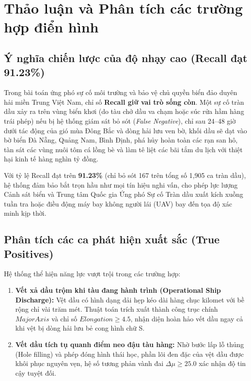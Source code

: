 \section{Thảo luận và Phân tích các trường hợp điển hình}
\label{sec:discussion}

\subsection{Ý nghĩa chiến lược của độ nhạy cao (Recall đạt 91.23\%)}
Trong bài toán ứng phó sự cố môi trường và bảo vệ chủ quyền biển đảo duyên hải miền Trung Việt Nam, chỉ số \textbf{Recall giữ vai trò sống còn}. 
Một sự cố tràn dầu xảy ra trên vùng biển khơi (do tàu chở dầu va chạm hoặc súc rửa hầm hàng trái phép) nếu bị hệ thống giám sát bỏ sót (\textit{False Negative}), chỉ sau 24--48 giờ dưới tác động của gió mùa Đông Bắc và dòng hải lưu ven bờ, khối dầu sẽ dạt vào bờ biển Đà Nẵng, Quảng Nam, Bình Định, phá hủy hoàn toàn các rạn san hô, tàn sát các vùng nuôi tôm cá lồng bè và làm tê liệt các bãi tắm du lịch với thiệt hại kinh tế hàng nghìn tỷ đồng. 

Với tỷ lệ Recall đạt trên \textbf{91.23\%} (chỉ bỏ sót 167 trên tổng số 1,905 ca tràn dầu), hệ thống đảm bảo bắt trọn hầu như mọi tín hiệu nghi vấn, cho phép lực lượng Cảnh sát biển và Trung tâm Quốc gia Ứng phó Sự cố Tràn dầu xuất kích xuồng tuần tra hoặc điều động máy bay không người lái (UAV) bay đến tọa độ xác minh kịp thời.

\subsection{Phân tích các ca phát hiện xuất sắc (True Positives)}
Hệ thống thể hiện năng lực vượt trội trong các trường hợp:
\begin{enumerate}
    \item \textbf{Vết xả dầu trộm khi tàu đang hành trình (Operational Ship Discharge):} Vệt dầu có hình dạng dải hẹp kéo dài hàng chục kilomet với bề rộng chỉ vài trăm mét. Thuật toán trích xuất thành công trục chính $MajorAxis$ và chỉ số $Elongation \ge 4.5$, nhận diện hoàn hảo vết dầu ngay cả khi vệt bị dòng hải lưu bẻ cong hình chữ S.
    \item \textbf{Vết dầu tích tụ quanh điểm neo đậu tàu hàng:} Nhờ bước lấp lỗ thủng (Hole filling) và phép đóng hình thái học, phần lõi đen đặc của vệt dầu được khôi phục nguyên vẹn, hệ số tương phản vành đai $\Delta \mu \ge 25.0$ xác nhận độ tin cậy tuyệt đối.
\end{enumerate}


